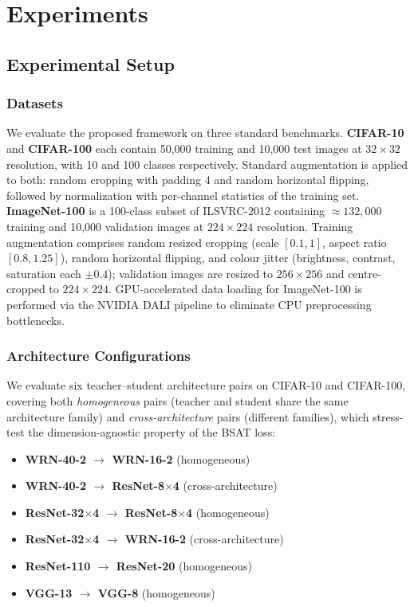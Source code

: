 \documentclass[conference]{IEEEtran}
\begin{document}







\section{Experiments}
\label{sec:experiments}

\subsection{Experimental Setup}

\subsubsection{Datasets}
We evaluate the proposed framework on three standard benchmarks.
\textbf{CIFAR-10} and \textbf{CIFAR-100} \cite{krizhevsky2009learning} each
contain 50{,}000 training and 10{,}000 test images at $32{\times}32$
resolution, with 10 and 100 classes respectively.
Standard augmentation is applied to both: random cropping with padding 4
and random horizontal flipping, followed by normalization with per-channel
statistics of the training set.
\textbf{ImageNet-100} is a 100-class subset of ILSVRC-2012
\cite{russakovsky2015imagenet} containing ${\approx}132{,}000$ training and
10{,}000 validation images at $224{\times}224$ resolution.
Training augmentation comprises random resized cropping (scale $[0.1, 1]$,
aspect ratio $[0.8, 1.25]$), random horizontal flipping, and colour jitter
(brightness, contrast, saturation each $\pm 0.4$); validation images are
resized to $256{\times}256$ and centre-cropped to $224{\times}224$.
GPU-accelerated data loading for ImageNet-100 is performed via the NVIDIA
DALI pipeline to eliminate CPU preprocessing bottlenecks.

\subsubsection{Architecture Configurations}
We evaluate six teacher--student architecture pairs on CIFAR-10 and
CIFAR-100, covering both \emph{homogeneous} pairs (teacher and student share
the same architecture family) and \emph{cross-architecture} pairs (different
families), which stress-test the dimension-agnostic property of the BSAT
loss:

\begin{itemize}
  \item \textbf{WRN-40-2 $\to$ WRN-16-2} (homogeneous)
  \item \textbf{WRN-40-2 $\to$ ResNet-8$\times$4} (cross-architecture)
  \item \textbf{ResNet-32$\times$4 $\to$ ResNet-8$\times$4} (homogeneous)
  \item \textbf{ResNet-32$\times$4 $\to$ WRN-16-2} (cross-architecture)
  \item \textbf{ResNet-110 $\to$ ResNet-20} (homogeneous)
  \item \textbf{VGG-13 $\to$ VGG-8} (homogeneous)
\end{itemize}
\end{document}
